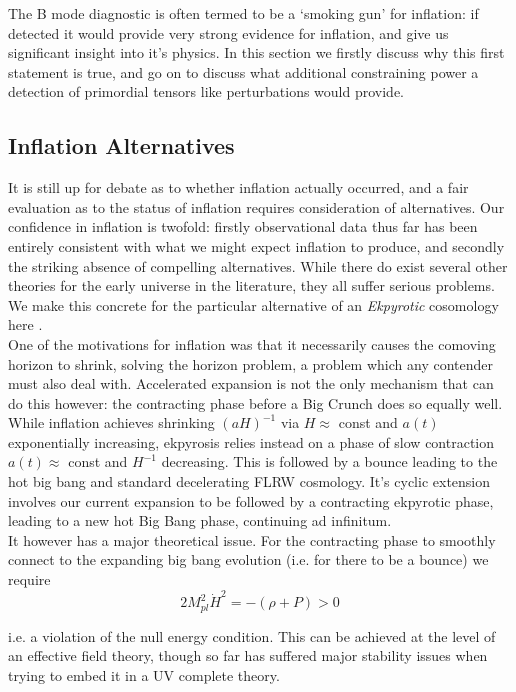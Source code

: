 \documentclass[a4paper,10pt]{article}
\newcommand{\Mp}{M_{pl}}
\begin{document}
The B mode diagnostic is often termed to be a `smoking gun' for inflation: if detected it would provide very strong evidence for inflation, and give us significant insight into it's physics. In this section we firstly discuss why this first statement is true, and go on to discuss what additional constraining power a detection of primordial tensors like perturbations would provide.

\subsection{Inflation Alternatives}

It is still up for debate as to whether inflation actually occurred, and a fair evaluation as to the status of inflation requires consideration of alternatives. Our confidence in inflation is twofold: firstly observational data thus far has been entirely consistent with what we might expect inflation to produce, and secondly the striking absence of compelling alternatives. While there do exist several other theories for the early universe in the literature, they all suffer serious problems. We make this concrete for the particular alternative of an \textit{Ekpyrotic} cosomology here \cite{CMBPol}.\\

One of the motivations for inflation was that it necessarily causes the comoving horizon to shrink, solving the horizon problem, a problem which any contender must also deal with. Accelerated expansion is not the only mechanism that can do this however: the contracting phase before a Big Crunch does so equally well. While inflation achieves shrinking $(aH)^{-1}$ via $H\approx$ const and $a(t)$ exponentially increasing, ekpyrosis relies instead on a phase of slow contraction $a(t)\approx$ const and $H^{-1}$ decreasing. This is followed by a bounce leading to the hot big bang and standard decelerating FLRW cosmology. It's cyclic extension involves our current expansion to be followed by a contracting ekpyrotic phase, leading to a new hot Big Bang phase, continuing ad infinitum.\\

It however has a major theoretical issue. For the contracting phase to smoothly connect to the expanding big bang evolution (i.e. for there to be a bounce) we require
\begin{equation}
2\Mp^2\dot{H}^2 = -(\rho + P) > 0
\end{equation} 

i.e. a violation of the null energy condition. This can be achieved at the level of an effective field theory, though so far has suffered major stability issues when trying to embed it in a UV complete theory.\\
\end{document}
